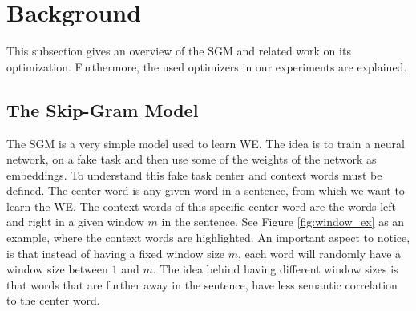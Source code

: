 
\section{Background}\label{chap:background}

This subsection gives an overview of the SGM and related work on its optimization. Furthermore, the used optimizers in our experiments are explained.
\subsection{The Skip-Gram Model}
The SGM is a very simple model used to learn WE. The idea is to train a neural network, on a fake task and then use some of the weights of the network as embeddings. To understand this fake task center and context words must be defined. The center word is any given word in a sentence, from which we want to learn the WE. The context words of this specific center word are the words left and right in a given window $m$ in the sentence. See Figure \ref{fig:window_ex} as an example, where the context words are highlighted. An important aspect to notice, is that instead of having a fixed window size $m$, each word will randomly have a window size between $1$ and $m$. The idea behind having different window sizes is that words that are further away in the sentence, have less semantic correlation to the center word.

